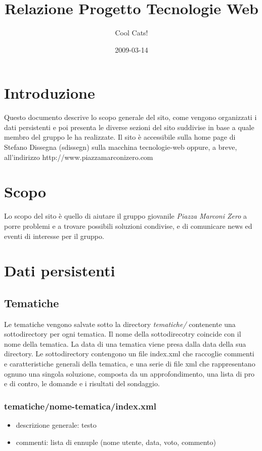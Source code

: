 \documentclass[a4paper,10pt]{article}
\author{Cool Cats!}
\title{Relazione Progetto Tecnologie Web}
\date{2009-03-14}
\begin{document}
\maketitle

\section{Introduzione}
Questo documento descrive lo scopo generale del sito, come vengono organizzati i dati persistenti e poi presenta le diverse sezioni del sito suddivise in base a quale membro del gruppo le ha realizzate. Il sito \`e accessibile sulla home page di Stefano Dissegna (sdissegn) sulla macchina tecnologie-web oppure, a breve, all'indirizzo http://www.piazzamarconizero.com

\section{Scopo}
Lo scopo del sito \`e quello di aiutare il gruppo giovanile \textit{Piazza Marconi Zero} a porre problemi e a trovare possibili soluzioni condivise, e di comunicare news ed eventi di interesse per il gruppo.

\section{Dati persistenti}

\subsection{Tematiche}
Le tematiche vengono salvate sotto la directory \textit{tematiche/} contenente una sottodirectory per ogni tematica. Il nome della sottodirecotry coincide con il nome della tematica. La data di una tematica viene presa dalla data della sua  directory.
Le sottodirectory contengono un file index.xml che raccoglie commenti e caratteristiche generali della tematica, e una serie di file xml che rappresentano ognuno una singola soluzione, composta da un approfondimento, una lista di pro e di contro, le domande e i risultati del sondaggio.
\subsubsection{tematiche/nome-tematica/index.xml}
\begin{itemize}
 \item descrizione generale: testo
 \item commenti: lista di ennuple (nome utente, data, voto, commento)
\end{itemize}
\end{document}
